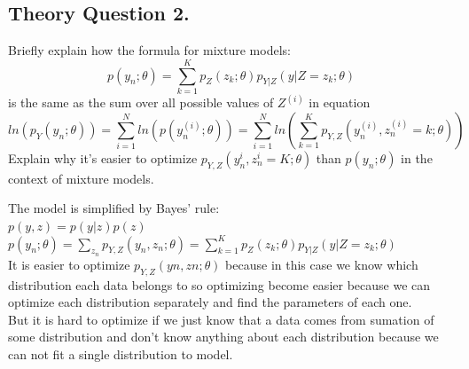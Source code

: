 \documentclass[12pt]{article}
\begin{document}
\subsection{Theory Question 2.}
Briefly explain how the formula for mixture models:
\begin{equation}
    p(y_n;\theta)=\sum_{k=1}^{K}p_Z(z_k;\theta)p_{Y|Z}(y|Z=z_k;\theta)
\end{equation}
is the same as the sum over all possible values of $Z^{(i)}$ in equation
\begin{equation}
    ln(p_Y(y_n;\theta))=\sum_{i=1}^N ln(p(y^{(i)}_n;\theta))=\sum_{i=1}^N ln(\sum_{k=1}^{K}p_{Y,Z}(y^{(i)}_n,z^{(i)}_n=k;\theta))
\end{equation}
Explain why it’s easier to optimize $p_{Y,Z}(y^{i}_n,z^{i}_n=K;\theta)$ than $p(y_n;\theta)$ in the context of mixture models.
\begin{qsolve}[solution]
    The model is simplified by Bayes' rule:
    \\$p(y,z)=p(y|z)p(z)$
        \\$p(y_n;\theta)=\sum_{z_n}p_{Y,Z}(y_n,z_n;\theta)=\sum_{k=1}^{K}p_Z(z_k;\theta)p_{Y|Z}(y|Z=z_k;\theta)$
    \\It is easier to optimize $p_{Y,Z}(yn, zn; θ)$ because in this case we know which distribution each data belongs to so optimizing become easier because we can optimize each distribution separately and find the parameters of each one.
    \\But it is hard to optimize if we just know that a data comes from sumation of some distribution and don't know anything about each distribution because we can not fit a single distribution to model.
\end{qsolve}
\end{document}
